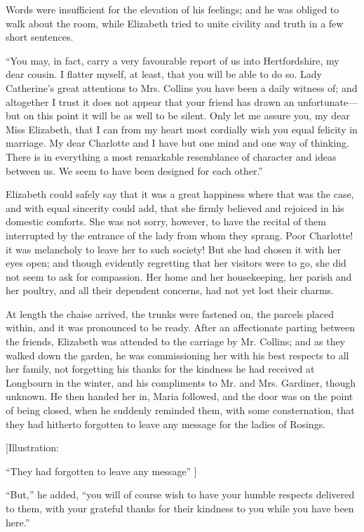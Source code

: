 \documentclass[12pt]{book}
\begin{document}
Words were insufficient for the elevation of his feelings; and he was obliged to walk about the room, while Elizabeth tried to unite civility and truth in a few short sentences.

``You may, in fact, carry a very favourable report of us into Hertfordshire, my dear cousin. I flatter myself, at least, that you will be able to do so. Lady Catherine's great attentions to Mrs. Collins you have been a daily witness of; and altogether I trust it does not appear that your friend has drawn an unfortunate---but on this point it will be as well to be silent. Only let me assure you, my dear Miss Elizabeth, that I can from my heart most cordially wish you equal felicity in marriage. My dear Charlotte and I have but one mind and one way of thinking. There is in everything a most remarkable resemblance of character and ideas between us. We seem to have been designed for each other.''

Elizabeth could safely say that it was a great happiness where that was the case, and with equal sincerity could add, that she firmly believed and rejoiced in his domestic comforts. She was not sorry, however, to have the recital of them interrupted by the entrance of the lady from whom they sprang. Poor Charlotte! it was melancholy to leave her to such society! But she had chosen it with her eyes open; and though evidently regretting that her visitors were to go, she did not seem to ask for compassion. Her home and her housekeeping, her parish and her poultry, and all their dependent concerns, had not yet lost their charms.

At length the chaise arrived, the trunks were fastened on, the parcels placed within, and it was pronounced to be ready. After an affectionate parting between the friends, Elizabeth was attended to the carriage by Mr. Collins; and as they walked down the garden, he was commissioning her with his best respects to all her family, not forgetting his thanks for the kindness he had received at Longbourn in the winter, and his compliments to Mr. and Mrs. Gardiner, though unknown. He then handed her in, Maria followed, and the door was on the point of being closed, when he suddenly reminded them, with some consternation, that they had hitherto forgotten to leave any message for the ladies of Rosings.

[Illustration:

``They had forgotten to leave any message'' ]

``But,'' he added, ``you will of course wish to have your humble respects delivered to them, with your grateful thanks for their kindness to you while you have been here.''
\end{document}
